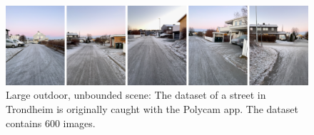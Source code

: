 \begin{figure}[!h]
    \centering
    \includegraphics[width=1.0\textwidth]{figures/streetview-dataset.png}
    \caption{Large outdoor, unbounded scene: The dataset of a street in Trondheim is originally caught with the Polycam app. The dataset contains 600 images.}
    \label{fig:streetview-dataset}
\end{figure}